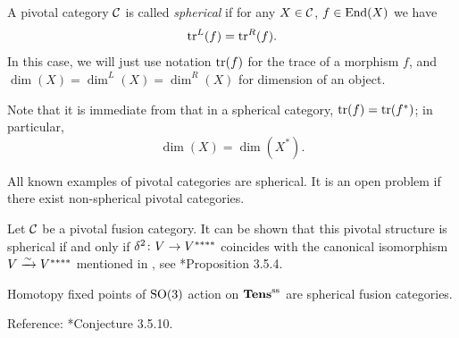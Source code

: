 \begin{definition}\label{d:spherical}
  A pivotal category $\mathcal{C}$ is called
  \emph{spherical}
  if for any $X\in \mathcal{C}$, $f\in \operatorname{End}(X)$ we have
  $$
  \operatorname{tr}^L(f)=\operatorname{tr}^R(f).
  $$
  In this case, we will just use notation $\operatorname{tr}(f)$ for the trace of a morphism
  $f$, and $\dim(X)=\dim^L(X)=\dim^R(X)$ for dimension of an object.
\end{definition}

Note that it is immediate from  that in a
spherical category, $\operatorname{tr}(f)=\operatorname{tr}(f^*)$; in particular,
\begin{equation}
 \dim (X)=\dim(X^*).
\end{equation}

\begin{remark}
  All known examples of pivotal categories are spherical. It is an open problem
  if there exist non-spherical pivotal categories.
\end{remark}

\begin{remark}
  Let $\mathcal{C}$ be a pivotal fusion category. It can be shown that this
  pivotal structure is spherical if and only if $\delta^2\colon V\to V^{****}$
  coincides with the canonical isomorphism $V\xrightarrow{\sim} V^{****}$ mentioned in
  , see *{Proposition 3.5.4}.
\end{remark}

\begin{conjecture}
  Homotopy fixed points of $\mathrm{SO}(3)$ action on $\mathbf{Tens}^{\mathrm{ss}}$ are spherical fusion
  categories.
\end{conjecture}
Reference: *{Conjecture 3.5.10}.